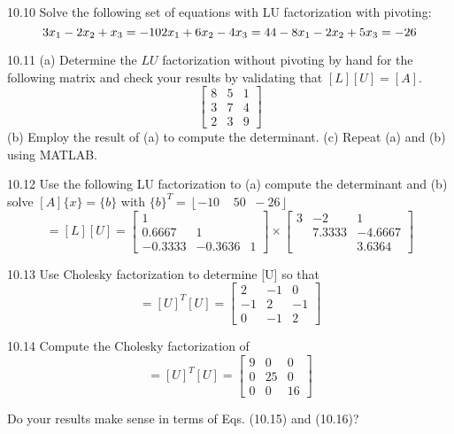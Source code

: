 \documentclass[../main.tex]{subfiles}
\begin{document}
10.10 Solve the following set of equations with LU factorization with pivoting:
\begin{equation}
3x_{1} - 2x_{2} + x_{3} = -10\\
2x_{1} + 6x_{2} - 4x_{3} = 44\\
-8x_{1} - 2x_{2} + 5x_{3} = -26
\end{equation}


10.11 (a) Determine the $LU$ factorization without pivoting
by hand for the following matrix and check your results by
validating that $[L][U] = [A]$.
\begin{equation}
\begin{bmatrix}
8& 5& 1\\
3& 7& 4\\
2& 3& 9
\end{bmatrix}
\end{equation}
(b) Employ the result of (a) to compute the determinant. (c) Repeat (a) and (b) using MATLAB.


10.12 Use the following LU factorization to (a) compute
the determinant and (b) solve $[A]\{x\} = \{b\}$ with $\{b\}^{T}=\left \lfloor -10\;\;\;\;50\;\;-26 \right \rfloor$
\begin{equation}
[A] = [L][U] =
\begin{bmatrix}
1&&\\
0.6667& 1&\\
-0.3333& -0.3636& 1
\end{bmatrix}
\times
\begin{bmatrix}
3& -2 & 1\\
&7.3333& -4.6667\\
&&3.6364
\end{bmatrix}
\end{equation}


10.13 Use Cholesky factorization to determine [U] so that
\begin{equation}
[A] = [U]^{T}[U] =
\begin{bmatrix}
2& -1 & 0\\
-1& 2 & -1\\
0& -1 & 2
\end{bmatrix}
\end{equation}


10.14 Compute the Cholesky factorization of 
\begin{equation}
[A] = [U]^{T}[U] =
\begin{bmatrix}
9& 0 & 0\\
0& 25 & 0\\
0& 0 & 16
\end{bmatrix}
\end{equation}

Do your results make sense in terms of Eqs. (10.15) and (10.16)?
\end{document}
